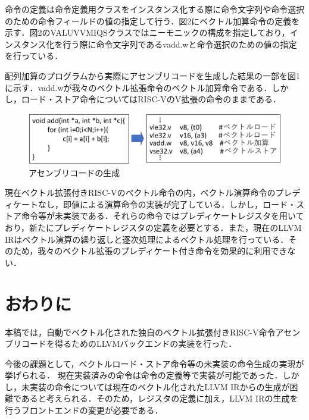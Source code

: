 ﻿\documentclass[a4j]{jarticle}
\begin{document}

命令の定義は命令定義用クラスをインスタンス化する際に命令文字列や命令選択のための命令フィールドの値の指定して行う．図2にベクトル加算命令の定義を示す．図2のVALUVVMIQSクラスではニーモニックの構成を指定しており，インスタンス化を行う際に命令文字列であるvadd.wと命令選択のための値の指定を行っている．

配列加算のプログラムから実際にアセンブリコードを生成した結果の一部を図1に示す．vadd.wが我々のベクトル拡張命令のベクトル加算命令である．しかし，ロード・ストア命令についてはRISC-VのV拡張の命令のままである．

\begin{figure}[tb]
    \centering
    \vspace{1truemm}
    \includegraphics[scale=0.4]{miqs_assembly_yokou.pdf}
    \caption{アセンブリコードの生成}
    \label{fig:assembly}
\end{figure}

現在ベクトル拡張付きRISC-Vのベクトル命令の内，ベクトル演算命令のプレディケートなし，即値による演算命令の実装が完了している．しかし，ロード・ストア命令等が未実装である．それらの命令ではプレディケートレジスタを用いており，新たにプレディケートレジスタの定義を必要とする．また，現在のLLVM IRはベクトル演算の繰り返しと逐次処理によるベクトル処理を行っている．そのため，我々のベクトル拡張のプレディケート付き命令を効果的に利用できない．

\section{おわりに}
本稿では，自動でベクトル化された独自のベクトル拡張付きRISC-V命令アセンブリコードを得るためのLLVMバックエンドの実装を行った．

今後の課題として，ベクトルロード・ストア命令等の未実装の命令生成の実現が挙げられる．
現在実装済みの命令は命令の定義等で実装が可能であった．しかし，未実装の命令については現在のベクトル化されたLLVM IRからの生成が困難であると考えられる．そのため，レジスタの定義に加え，LLVM IRの生成を行うフロントエンドの変更が必要である．
\end{document}
